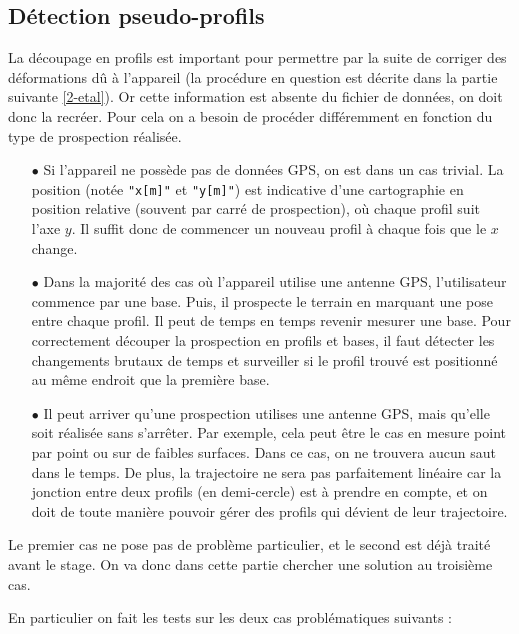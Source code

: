 \documentclass[12pt]{article}
\begin{document}
    \newpage
    \subsection{Détection pseudo-profils}

    La découpage en profils est important pour permettre par la suite de corriger des déformations dû à l'appareil (la procédure en question est décrite dans la partie suivante \ref{2-etal}). Or cette information est absente du fichier de données, on doit donc la recréer. Pour cela on a besoin de procéder différemment en fonction du type de prospection réalisée.

    \begin{enumerate}
        \item[$\bullet$] Si l'appareil ne possède pas de données GPS, on est dans un cas trivial. La position (notée \texttt{"x[m]"} et \texttt{"y[m]"}) est indicative d'une cartographie en position relative (souvent par carré de prospection), où chaque profil suit l'axe $y$. Il suffit donc de commencer un nouveau profil à chaque fois que le $x$ change.
        \item[$\bullet$] Dans la majorité des cas où l'appareil utilise une antenne GPS, l'utilisateur commence par une base. Puis, il prospecte le terrain en marquant une pose entre chaque profil. Il peut de temps en temps revenir mesurer une base. Pour correctement découper la prospection en profils et bases, il faut détecter les changements brutaux de temps et surveiller si le profil trouvé est positionné au même endroit que la première base.
        \item[$\bullet$] Il peut arriver qu'une prospection utilises une antenne GPS, mais qu'elle soit réalisée sans s'arrêter. Par exemple, cela peut être le cas en mesure point par point ou sur de faibles surfaces. Dans ce cas, on ne trouvera aucun saut dans le temps. De plus, la trajectoire ne sera pas parfaitement linéaire car la jonction entre deux profils (en demi-cercle) est à prendre en compte, et on doit de toute manière pouvoir gérer des profils qui dévient de leur trajectoire.
    \end{enumerate}

    Le premier cas ne pose pas de problème particulier, et le second est déjà traité avant le stage. On va donc dans cette partie chercher une solution au troisième cas.

    En particulier on fait les tests sur les deux cas problématiques suivants :
\end{document}
